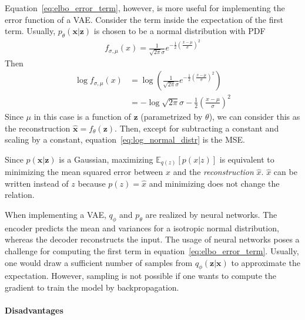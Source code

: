 Equation~\ref{eq:elbo_error_term}, however, is more useful for implementing the error function of a \ac{VAE}.
Consider the term inside the expectation of the first term.
Usually, $p_\theta(\bm{x}|\bm{z})$ is chosen to be a normal distribution with \ac{PDF}
\begin{align}
    f_{\sigma,\mu}(x) = \frac{1}{\sqrt{2\pi}\sigma}e^{-\frac{1}{2}\left( \frac{x-\mu}{\sigma} \right)^2}
\end{align}
Then
\begin{align}
    \log f_{\sigma,\mu}(x) &= \log \left( \frac{1}{\sqrt{2\pi}\sigma}e^{-\frac{1}{2}\left( \frac{x-\mu}{\sigma} \right)^2} \right)\\
    &= - \log \sqrt{2\pi}\sigma -\frac{1}{2}\left( \frac{x-\mu}{\sigma} \right)^2 \label{eq:log_normal_distr}
\end{align}
Since $\mu$ in this case is a function of $\bm{z}$ (parametrized by $\theta$), we can consider this as the reconstruction $\hat{\bm{x}} = f_\theta(\bm{z})$.
Then, except for subtracting a constant and scaling by a constant, equation~\ref{eq:log_normal_distr} is the \ac{MSE}.

Since $p(\bm{x}|\bm{z})$ is a Gaussian, maximizing $\mathbb{E}_{q(z)} \left[ p(x|z) \right]$ is equivalent to minimizing the mean squared error between $x$ and the \textit{reconstruction} $\hat{x}$.
$\hat{x}$ can be written instead of $z$ because $p(z) = \hat{x}$ and minimizing does not change the relation.

When implementing a \ac{VAE}, $q_\phi$ and $p_\theta$ are realized by neural networks.
The encoder predicts the mean and variances for a isotropic normal distribution, whereas the decoder reconstructs the input.
The usage of neural networks poses a challenge for computing the first term in equation~\ref{eq:elbo_error_term}.
Usually, one would draw a sufficient number of samples from $q_\phi(\bm{z}|\bm{x})$ to approximate the expectation.
However, sampling is not possible if one wants to compute the gradient to train the model by backpropagation.

\paragraph{Disadvantages}

